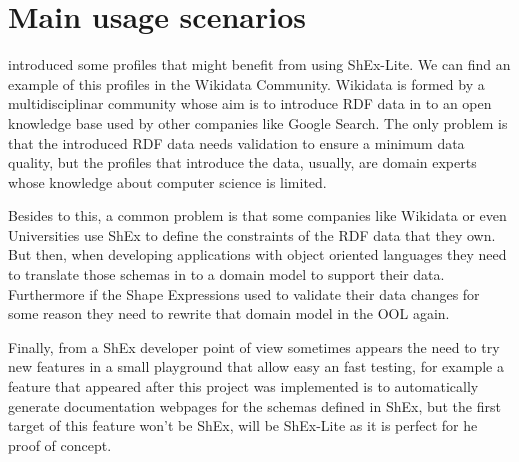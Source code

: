\section{Main usage scenarios}

 introduced some profiles that might benefit from using ShEx-Lite. We can find an example of this profiles in the Wikidata Community. Wikidata is formed by a multidisciplinar community whose aim is to introduce RDF data in to an open knowledge base used by other companies like Google Search. The only problem is that the introduced RDF data needs validation to ensure a minimum data quality, but the profiles that introduce the data, usually, are domain experts whose knowledge about computer science is limited. 

Besides to this, a common problem is that some companies like Wikidata or even Universities use ShEx to define the constraints of the RDF data that they own. But then, when developing applications with object oriented languages they need to translate those schemas in to a domain model to support their data. Furthermore if the Shape Expressions used to validate their data changes for some reason they need to rewrite that domain model in the OOL again. 

Finally, from a ShEx developer point of view sometimes appears the need to try new features in a small playground that allow easy an fast testing, for example a feature that appeared after this project was implemented is to automatically generate documentation webpages for the schemas defined in ShEx, but the first target of this feature won’t be ShEx, will be ShEx-Lite as it is perfect for he proof of concept.

